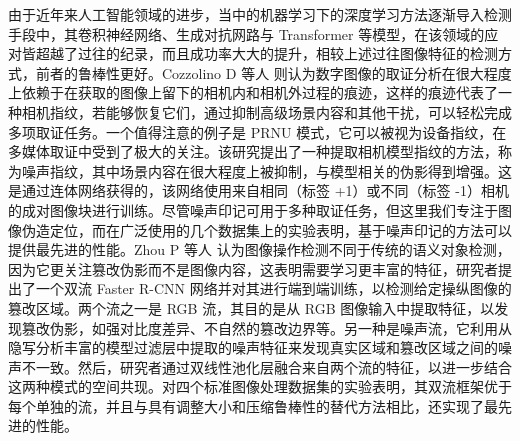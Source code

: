 由于近年来人工智能领域的进步，当中的机器学习下的深度学习方法逐渐导入检测手段中，其卷积神经网络、生成对抗网路与 Transformer 等模型，在该领域的应对皆超越了过往的纪录，而且成功率大大的提升，相较上述过往图像特征的检测方式，前者的鲁棒性更好。Cozzolino D 等人 \cite{cozzolino2019noiseprint} 则认为数字图像的取证分析在很大程度上依赖于在获取的图像上留下的相机内和相机外过程的痕迹，这样的痕迹代表了一种相机指纹，若能够恢复它们，通过抑制高级场景内容和其他干扰，可以轻松完成多项取证任务。一个值得注意的例子是 PRNU 模式，它可以被视为设备指纹，在多媒体取证中受到了极大的关注。该研究提出了一种提取相机模型指纹的方法，称为噪声指纹，其中场景内容在很大程度上被抑制，与模型相关的伪影得到增强。这是通过连体网络获得的，该网络使用来自相同（标签 +1）或不同（标签 -1）相机的成对图像块进行训练。尽管噪声印记可用于多种取证任务，但这里我们专注于图像伪造定位，而在广泛使用的几个数据集上的实验表明，基于噪声印记的方法可以提供最先进的性能。Zhou P 等人 \cite{zhou2018learning}认为图像操作检测不同于传统的语义对象检测，因为它更关注篡改伪影而不是图像内容，这表明需要学习更丰富的特征，研究者提出了一个双流 Faster R-CNN 网络并对其进行端到端训练，以检测给定操纵图像的篡改区域。两个流之一是 RGB 流，其目的是从 RGB 图像输入中提取特征，以发现篡改伪影，如强对比度差异、不自然的篡改边界等。另一种是噪声流，它利用从隐写分析丰富的模型过滤层中提取的噪声特征来发现真实区域和篡改区域之间的噪声不一致。然后，研究者通过双线性池化层融合来自两个流的特征，以进一步结合这两种模式的空间共现。对四个标准图像处理数据集的实验表明，其双流框架优于每个单独的流，并且与具有调整大小和压缩鲁棒性的替代方法相比，还实现了最先进的性能。

